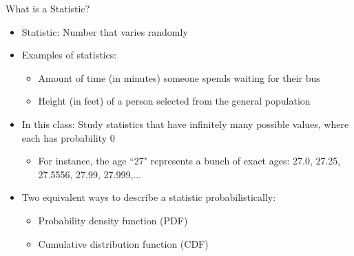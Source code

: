 \documentclass{beamer}
\begin{document}
\begin{frame}{What is a Statistic?}
    \begin{itemize}
        \item Statistic: Number that varies randomly

        \vfill
        
        \item Examples of statistics:
        \begin{itemize}
            \item Amount of time (in minutes) someone spends waiting for their bus
            \item Height (in feet) of a person selected from the general population
        \end{itemize}

        \vfill 

        \item In this class: Study statistics that have infinitely many possible values, where each has probability 0
        \begin{itemize}
            \item For instance, the age ``27" represents a bunch of exact ages: 27.0, 27.25, 27.5556, 27.99, 27.999,...
        \end{itemize}

        \vfill

        \item Two equivalent ways to describe a statistic probabilistically:
        \begin{itemize}
            \item Probability density function (PDF)
            \item Cumulative distribution function (CDF)
        \end{itemize}
        
    \end{itemize}
\end{frame}
\end{document}
